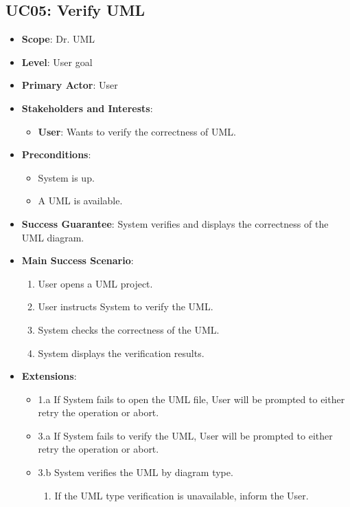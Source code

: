 \documentclass[12pt]{article}
\begin{document}
    \subsection{UC05: Verify UML}
    \begin{itemize}
        \item \textbf{Scope}: Dr. UML
        \item \textbf{Level}: User goal
        \item \textbf{Primary Actor}: User
        \item \textbf{Stakeholders and Interests}:
        \begin{itemize}
            \item \textbf{User}: Wants to verify the correctness of UML.
        \end{itemize}
        \item \textbf{Preconditions}:
        \begin{itemize}
            \item System is up.
            \item A UML is available.
        \end{itemize}
        \item \textbf{Success Guarantee}: System verifies and displays the correctness of the UML diagram.
        \item \textbf{Main Success Scenario}:
        \begin{enumerate}
            \item User opens a UML project.
            \item User instructs System to verify the UML.
            \item System checks the correctness of the UML.
            \item System displays the verification results.
        \end{enumerate}
        \item \textbf{Extensions}:
        \begin{itemize}
            \item 1.a If System fails to open the UML file, User will be prompted to either retry the operation or abort.
            \item 3.a If System fails to verify the UML, User will be prompted to either retry the operation or abort.
            \item 3.b System verifies the UML by diagram type.
            \begin{enumerate}
                \item If the UML type verification is unavailable, inform the User.

\end{enumerate}
\end{itemize}
\end{itemize}
\end{document}
